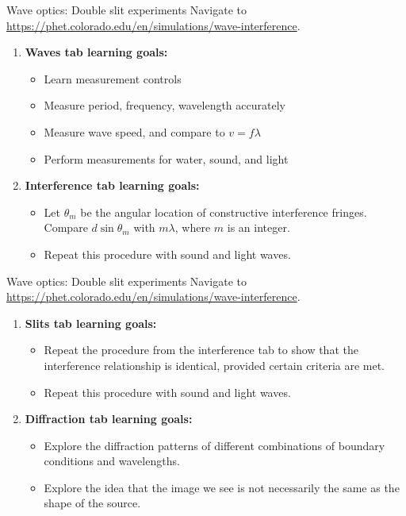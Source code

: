 \documentclass{beamer}
\begin{document}
\begin{frame}{Wave optics: Double slit experiments}
\small
Navigate to \url{https://phet.colorado.edu/en/simulations/wave-interference}.
\footnotesize
\begin{enumerate}
\item \textbf{Waves tab learning goals:}
\begin{itemize}
\item Learn measurement controls
\item Measure period, frequency, wavelength accurately
\item Measure wave speed, and compare to $v = f\lambda$
\item Perform measurements for water, sound, and light
\end{itemize}
\item \textbf{Interference tab learning goals:}
\begin{itemize}
\item Let $\theta_m$ be the angular location of constructive interference fringes.  Compare $d\sin\theta_m$ with $m\lambda$, where $m$ is an integer.
\item Repeat this procedure with sound and light waves.
\end{itemize}
\end{enumerate}
\end{frame}

\begin{frame}{Wave optics: Double slit experiments}
\small
Navigate to \url{https://phet.colorado.edu/en/simulations/wave-interference}.
\footnotesize
\begin{enumerate}
\item \textbf{Slits tab learning goals:}
\begin{itemize}
\item Repeat the procedure from the interference tab to show that the interference relationship is identical, provided certain criteria are met.
\item Repeat this procedure with sound and light waves.
\end{itemize}
\item \textbf{Diffraction tab learning goals:}
\begin{itemize}
\item Explore the diffraction patterns of different combinations of boundary conditions and wavelengths.
\item Explore the idea that the image we see is not necessarily the same as the shape of the source.
\end{itemize}
\end{enumerate}
\end{frame}
\end{document}

